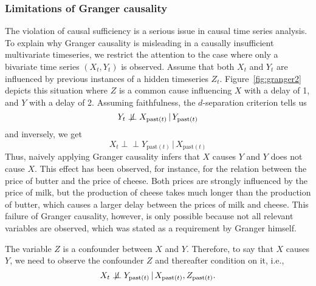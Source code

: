 \documentclass{article}
\newcommand{\giv}{\,|\,}
\newcommand{\indep}{\perp \!\!\! \perp}
\newcommand{\dep}{\centernot{\indep}}
\begin{document}
\subsubsection{Limitations of Granger causality}

The violation of causal sufficiency is a serious issue in causal time series analysis. To explain why Granger causality is misleading in a causally insufficient multivariate timeseries, we restrict the attention to the case where only a bivariate time series $(X_t, Y_t)$ is observed. Assume that both $X_t$ and $Y_t$ are influenced by previous instances of a hidden timeseries $Z_t$. Figure~\ref{fig:granger2} depicts this situation where $Z$ is a common cause influencing $X$ with a delay of 1, and $Y$ with a delay of 2. Assuming faithfulness, the $d$-separation criterion tells us  
$$
    Y_t \dep X_{\text{past}(t)} \giv Y_{\text{past}(t)}
$$
\noindent and inversely, we get
$$
    X_t \indep Y_{\text{past}(t)} \giv X_{\text{past}(t)}
$$
\noindent Thus, naively applying Granger causality infers that $X$ causes $Y$ and $Y$ does not cause $X$. This effect has been observed, for instance, for the relation between the price of butter and the price of cheese. Both prices are strongly influenced by the price of milk, but the production of cheese takes much longer than the production of butter, which causes a larger delay between the prices of milk and cheese. This failure of Granger causality, however, is only possible because not all relevant variables are observed, which was stated as a requirement by Granger himself.

The variable $Z$ is a confounder between $X$ and $Y$. Therefore, to say that $X$ causes $Y$, we need to observe the confounder $Z$ and thereafter condition on it, i.e., 
$$
    X_t \dep Y_{\text{past}(t)} \giv X_{\text{past}(t)}, Z_{\text{past}(t)}.
$$
\end{document}
